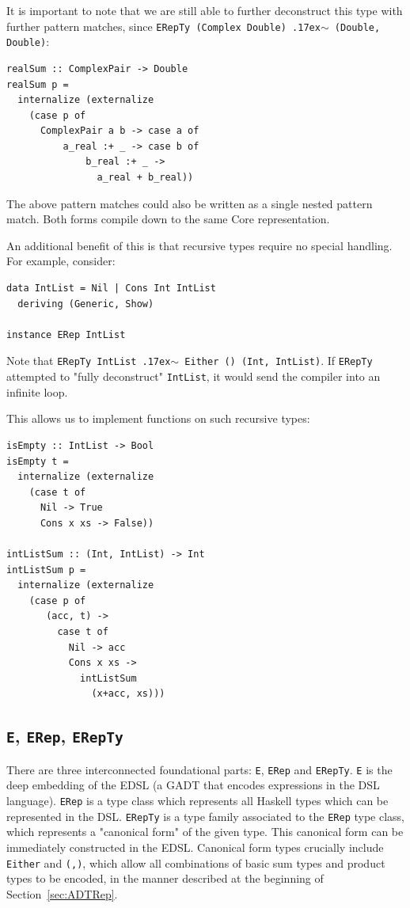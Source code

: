 \documentclass[sigplan,anonymous,review]{acmart}
\newcommand{\typeeq}{\raise.17ex\hbox{$\scriptstyle\mathtt{\sim}$}\,\;}
\newcommand{\ttt}{\texttt}
\begin{document}
It is important to note that we are still able to further deconstruct this type
with further pattern matches, since \ttt{ERepTy (Complex Double) \typeeq (Double, Double)}:

\begin{lstlisting}
realSum :: ComplexPair -> Double
realSum p =
  internalize (externalize
    (case p of
      ComplexPair a b -> case a of
          a_real :+ _ -> case b of
              b_real :+ _ ->
                a_real + b_real))
\end{lstlisting}

The above pattern matches could also be written as a single nested pattern
match. Both forms compile down to the same Core representation.

An additional benefit of this is that recursive types require no special handling. For
example, consider:

\begin{lstlisting}
data IntList = Nil | Cons Int IntList
  deriving (Generic, Show)

instance ERep IntList
\end{lstlisting}

Note that \ttt{ERepTy IntList \typeeq Either () (Int, IntList)}. If \ttt{ERepTy}
attempted to "fully deconstruct" \ttt{IntList}, it would send the compiler
into an infinite loop.

This allows us to implement functions on such recursive types:

\begin{lstlisting}
isEmpty :: IntList -> Bool
isEmpty t =
  internalize (externalize
    (case t of
      Nil -> True
      Cons x xs -> False))

intListSum :: (Int, IntList) -> Int
intListSum p =
  internalize (externalize
    (case p of
       (acc, t) ->
         case t of
           Nil -> acc
           Cons x xs ->
             intListSum
               (x+acc, xs)))
\end{lstlisting}

\subsection{\ttt{E}, \ttt{ERep}, \ttt{ERepTy}}

There are three interconnected foundational parts: \ttt{E}, \ttt{ERep} and
\ttt{ERepTy}. \ttt{E} is the deep embedding of the EDSL (a GADT that encodes
expressions in the DSL language). \ttt{ERep} is a type class which represents
all Haskell types which can be represented in the DSL. \ttt{ERepTy} is a type
family associated to the \ttt{ERep} type class, which represents a "canonical form"
of the given type. This canonical form can be immediately constructed in the EDSL.
Canonical form types crucially include \ttt{Either} and \ttt{(,)}, which
allow all combinations of basic sum types and product types to be encoded, in the
manner described at the beginning of Section~\ref{sec:ADTRep}.
\end{document}
